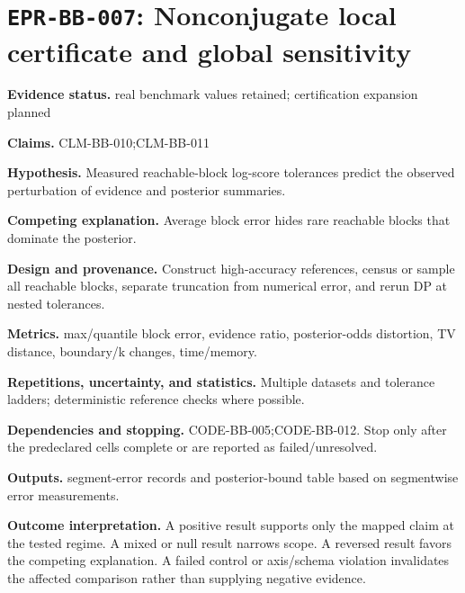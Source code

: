 \section[\texttt{EPR-BB-007}]{\texttt{EPR-BB-007}: Nonconjugate local certificate and global sensitivity}
\textbf{Evidence status.} real benchmark values retained; certification expansion planned\par
\textbf{Claims.} CLM-BB-010;CLM-BB-011\par
\textbf{Hypothesis.} Measured reachable-block log-score tolerances predict the observed perturbation of evidence and posterior summaries.\par
\textbf{Competing explanation.} Average block error hides rare reachable blocks that dominate the posterior.\par
\textbf{Design and provenance.} Construct high-accuracy references, census or sample all reachable blocks, separate truncation from numerical error, and rerun DP at nested tolerances.\par
\textbf{Metrics.} max/quantile block error, evidence ratio, posterior-odds distortion, TV distance, boundary/k changes, time/memory.\par
\textbf{Repetitions, uncertainty, and statistics.} Multiple datasets and tolerance ladders; deterministic reference checks where possible.\par
\textbf{Dependencies and stopping.} CODE-BB-005;CODE-BB-012. Stop only after the predeclared cells complete or are reported as failed/unresolved.\par
\textbf{Outputs.} segment-error records and posterior-bound table based on segmentwise error measurements.\par
\textbf{Outcome interpretation.} A positive result supports only the mapped claim at the tested regime. A mixed or null result narrows scope. A reversed result favors the competing explanation. A failed control or axis/schema violation invalidates the affected comparison rather than supplying negative evidence.

